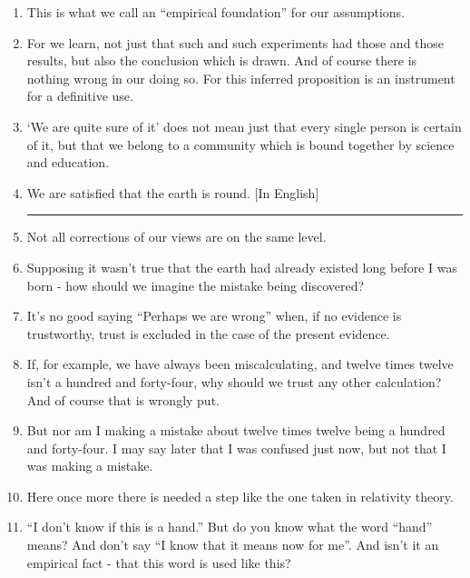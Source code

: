 \documentclass{book}
\begin{document}
\begin{enumerate}
\item
This is what we call an ``empirical foundation'' for our assumptions.

\item
For we learn, not just that such and such experiments had those and those
results, but also the conclusion which is drawn. And of course there is nothing
wrong in our doing so. For this inferred proposition is an instrument for a
definitive use.

\item
`We are quite sure of it' does not mean just that every single person is
certain of it, but that we belong to a community which is bound together by
science and education.

\item
We are satisfied that the earth is round. {[}In English{]}

\begin{center}\rule{0.5\linewidth}{\linethickness}\end{center}

\item
Not all corrections of our views are on the same level.

\item
Supposing it wasn't true that the earth had already existed long before I was
born - how should we imagine the mistake being discovered?

\item
It's no good saying ``Perhaps we are wrong'' when, if no evidence is
trustworthy, trust is excluded in the case of the present evidence.

\item
If, for example, we have always been miscalculating, and twelve times twelve
isn't a hundred and forty-four, why should we trust any other calculation? And
of course that is wrongly put.

\item
But nor am I making a mistake about twelve times twelve being a hundred and
forty-four. I may say later that I was confused just now, but not that I was
making a mistake.

\item
Here once more there is needed a step like the one taken in relativity theory.

\item
``I don't know if this is a hand.'' But do you know what the word ``hand''
means? And don't say ``I know that it means now for me''. And isn't it an
empirical fact - that this word is used like this?


\end{enumerate}
\end{document}
